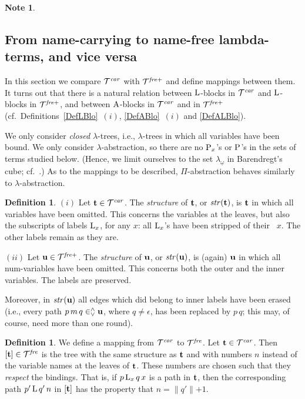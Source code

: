 \documentclass{article}
\theoremstyle{plain}
\newtheorem{Note}[The]{Note}
\theoremstyle{definition}
\newtheorem{Def}[The]{Definition}
\begin{document}
{\begin{Note}
\end{Note}

\subsection{From name-carrying to name-free lambda-terms, and vice versa}




In this section we compare ${\cal T}^{\it car}$ with ${\cal T}^{\it fre+}$ and define mappings between them. It turns out that there is a natural relation between ${\rm L}$-blocks in ${\cal T}^{\it car}$ and ${\rm L}$-blocks in ${\cal T}^{\it fre+}$, and between ${\rm A}$-blocks in ${\cal T}^{\it car}$ and in ${\cal T}^{\it fre+}$ (cf.\ Definitions~\ref{DefLBlo}~$(i)$, \ref{DefABlo}~$(i)$ and \ref{DefALBlo}).

We only consider {\it closed\/} $\lambda$-trees, i.e., $\lambda$-trees in which all variables have been bound. We only consider $\lambda$-abstraction, so there are no ${\rm P}_x$'s or ${\rm P}$'s in the sets of terms studied below. (Hence, we limit ourselves to the set $\lambda_{\underline{\omega}}$ in Barendregt's cube; cf.\ \citealp{Bar92}.) As to the mappings to be described, $\Pi$-abstraction behaves similarly to $\lambda$-abstraction.



\begin{Def}
$(i)$ Let ${\bf t} \in {\cal T}^{\it car}$. The {\em structure\/} of ${\bf t}$, or ${\it str}({\bf t})$, is ${\bf t}$ in which all variables have been omitted. This concerns the variables at the leaves, but also the subscripts of labels ${\rm L}_x$, for any $x$: all ${\rm L}_x$'s have been stripped of their~ $x$. The other labels remain as they are.

$(ii)$ Let ${\bf u} \in {\cal T}^{\it fre+}$. The {\em structure\/} of ${\bf u}$, or ${\it str}({\bf u})$, is (again) ${\bf u}$ in which all num-variables have been omitted. This concerns both the outer and the inner variables. The labels are preserved.

Moreover, in ${\it str}({\bf u})$ all edges which did belong to inner labels have been erased (i.e., every path $p \, m \, q \in^\wedge_\vee {\bf u}$, where $q \not = \epsilon$, has been replaced by $p \, q$; this may, of course, need more than one round).
\end{Def}


\begin{Def}\label{DefMapStr} We define a mapping from ${\cal T}^{\it car}$ to ${\cal T}^{\it fre}$. Let ${\bf t} \in {\cal T}^{\it car}$. Then $[{\bf t}] \in {\cal T}^{\it fre}$ is the tree with the same structure as ${\bf t}$ and with numbers $n$ instead of the variable names at the leaves of ${\bf t}$. These numbers are chosen such that they {\em respect} the bindings. That is, if $p \, {\rm L}_x \, q \, x$ is a path in ${\bf t}$, then the corresponding path $p' \, {\rm L} \, q' \, n$ in $[{\bf t}]$ has the property that $n =  \lVert q' \lVert  + 1$.
\end{Def}

}
\end{document}
